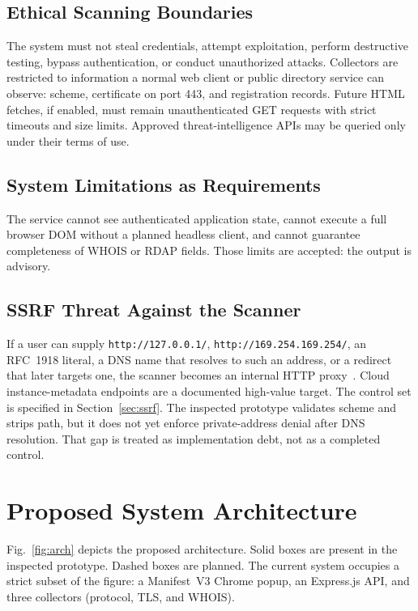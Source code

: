 \documentclass[conference]{IEEEtran}
\begin{document}
\subsection{Ethical Scanning Boundaries}
The system must not steal credentials, attempt exploitation, perform destructive testing, bypass authentication, or conduct unauthorized attacks. Collectors are restricted to information a normal web client or public directory service can observe: scheme, certificate on port 443, and registration records. Future HTML fetches, if enabled, must remain unauthenticated GET requests with strict timeouts and size limits. Approved threat-intelligence APIs may be queried only under their terms of use.

\subsection{System Limitations as Requirements}
The service cannot see authenticated application state, cannot execute a full browser DOM without a planned headless client, and cannot guarantee completeness of WHOIS or RDAP fields. Those limits are accepted: the output is advisory.

\subsection{SSRF Threat Against the Scanner}
If a user can supply \texttt{http://127.0.0.1/}, \texttt{http://169.254.169.254/}, an RFC~1918 literal, a DNS name that resolves to such an address, or a redirect that later targets one, the scanner becomes an internal HTTP proxy~\cite{rfc1918,owaspssrf}. Cloud instance-metadata endpoints are a documented high-value target. The control set is specified in Section~\ref{sec:ssrf}. The inspected prototype validates scheme and strips path, but it does not yet enforce private-address denial after DNS resolution. That gap is treated as implementation debt, not as a completed control.

\section{Proposed System Architecture}
\label{sec:arch}
Fig.~\ref{fig:arch} depicts the proposed architecture. Solid boxes are present in the inspected prototype. Dashed boxes are planned. The current system occupies a strict subset of the figure: a Manifest~V3 Chrome popup, an Express.js API, and three collectors (protocol, TLS, and WHOIS).
\end{document}
